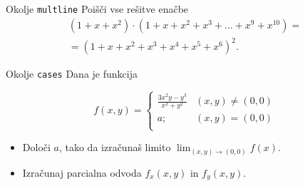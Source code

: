 \begin{frame}{Okolje \texttt{multline}}
	Poišči vse rešitve enačbe
	\begin{multline*}
(1+x+x^2) \cdot (1+x+x^2+x^3+\ldots+x^9+x^{10}) = \\
=(1+x+x^2+x^3+x^4+x^5+x^6)^2.
	\end{multline*}
\end{frame}

\begin{frame}{Okolje \texttt{cases}}
	Dana je funkcija
	
		\[ f(x,y) = 
		\begin{cases}
			\frac{3x^2y-y^3}{x^2+y^2} & (x,y) \neq (0,0) \\
			a; & (x,y) = (0,0) \\ 
		\end{cases} \]
		
	\begin{itemize}
	\item Določi $a$, tako da izračunaš limito \( \lim_{(x,y)\to(0,0)} f(x). \)
	\item Izračunaj parcialna odvoda $f_x(x,y)$ in $f_y(x,y)$.
	\end{itemize}
\end{frame}
